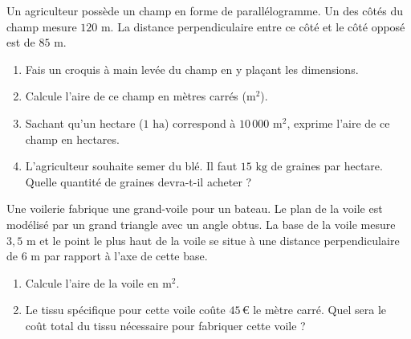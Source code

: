 \documentclass[a4paper]{book}
\begin{document}
    
    \begin{exercice}
        Un agriculteur possède un champ en forme de parallélogramme. Un des côtés du champ mesure $120\text{ m}$. La distance perpendiculaire entre ce côté et le côté opposé est de $85\text{ m}$.
        \begin{enumerate}
            \item Fais un croquis à main levée du champ en y plaçant les dimensions.
            \item Calcule l'aire de ce champ en mètres carrés ($\text{m}^2$).
            \item Sachant qu'un hectare ($1\text{ ha}$) correspond à $10\,000\text{ m}^2$, exprime l'aire de ce champ en hectares.
            \item L'agriculteur souhaite semer du blé. Il faut $15\text{ kg}$ de graines par hectare. Quelle quantité de graines devra-t-il acheter ?
        \end{enumerate}
    \end{exercice}
    
    
    \begin{exercice}
        Une voilerie fabrique une grand-voile pour un bateau. Le plan de la voile est modélisé par un grand triangle avec un angle obtus. La base de la voile mesure $3,5\text{ m}$ et le point le plus haut de la voile se situe à une distance perpendiculaire de $6\text{ m}$ par rapport à l'axe de cette base.
        \begin{enumerate}
            \item Calcule l'aire de la voile en $\text{m}^2$.
            \item Le tissu spécifique pour cette voile coûte $45$\,\euro{} le mètre carré. Quel sera le coût total du tissu nécessaire pour fabriquer cette voile ?
        \end{enumerate}
    \end{exercice}
    
\end{document}
